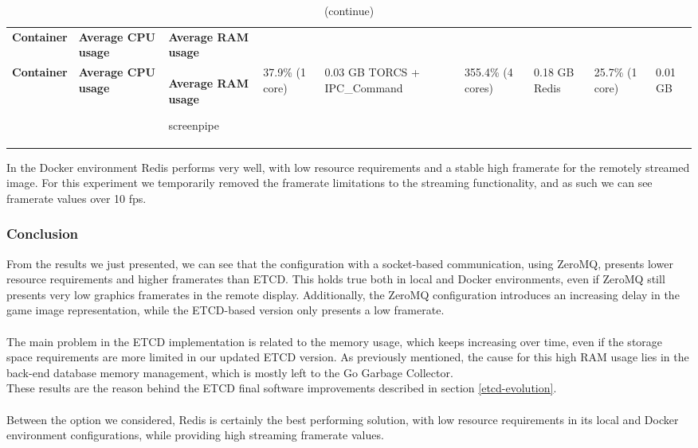\def\arraystretch{1.75}
\begin{longtable}{ 
		>{\centering}p{} 
		>{\centering}p{}
		>{\centering}p{}}
	
	
	\caption{Docker environment with Redis.} \label{tab:resource-docker-env-redis} \\
	\coloredTableHead
	\textbf{\color{white}Container} & 
	\centering\textbf{\color{white}Average CPU usage} &
	\centering\textbf{\color{white}Average RAM usage}
	\endfirsthead
	
	\caption[]{(continue)}\\
	\textbf{\color{white}Container} & 
	\centering\textbf{\color{white}Average CPU usage} &
	\centering\textbf{\color{white}Average RAM usage}
	\endhead
	
	screenpipe & 37.9\% (1 core) & 0.03 GB \cr
	TORCS + IPC\_Command & 355.4\% (4 cores) & 0.18 GB \cr
	Redis & 25.7\% (1 core) & 0.01 GB \cr
\end{longtable}
\begin{center}
	\centering{\textbf{Average framerate = 45.4 fps}}
\end{center}
In the Docker environment Redis performs very well, with low resource requirements and a stable high framerate for the remotely streamed image. For this experiment we temporarily removed the framerate limitations to the streaming functionality, and as such we can see framerate values over 10 fps.

\subsubsection{Conclusion}
From the results we just presented, we can see that the configuration with a socket-based communication, using ZeroMQ, presents lower resource requirements and higher framerates than ETCD. This holds true both in local and Docker environments, even if ZeroMQ still presents very low graphics framerates in the remote display. Additionally, the ZeroMQ configuration introduces an increasing delay in the game image representation, while the ETCD-based version only presents a low framerate. \\ \\
The main problem in the ETCD implementation is related to the memory usage, which keeps increasing over time, even if the storage space requirements are more limited in our updated ETCD version. As previously mentioned, the cause for this high RAM usage lies in the back-end database memory management, which is mostly left to the Go Garbage Collector. \\
These results are the reason behind the ETCD final software improvements described in section \ref{etcd-evolution}. \\ \\
Between the option we considered, Redis is certainly the best performing solution, with low resource requirements in its local and Docker environment configurations, while providing high streaming framerate values.

